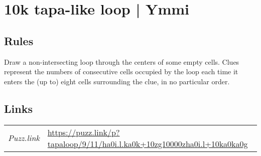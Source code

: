 \section{10k tapa-like loop | {\normalfont Ymmi}}
\label{sec:04-10k-tapa-like-loop-ymmi}

\subsection*{Rules}
\begin{markdown}
Draw a non-intersecting loop through the centers of some empty cells. Clues represent the numbers of consecutive cells occupied by the loop each time it enters the (up to) eight cells surrounding the clue, in no particular order.
\end{markdown}
\subsection*{Links}
\begin{tabularx}{\textwidth}{l X}
\emph{Puzz.link} & \url{https://puzz.link/p?tapaloop/9/11/ha0i.l.ka0k+10zg10000zha0i.l+10ka0ka0g} \\
\end{tabularx}
\pagebreak
